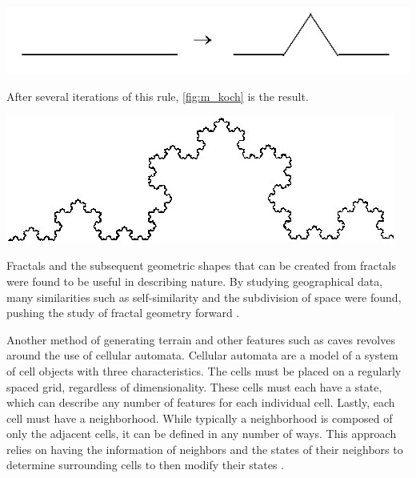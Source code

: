 \documentclass[10pt]{report}
\begin{document}
		\begin{minipage}{\textwidth}
			\centering
			\includegraphics[scale=0.5]{m_reprule}
			\label{fig:m_reprule}
		\end{minipage}
		
		After several iterations of this rule, \autoref{fig:m_koch} is the result.
		
		\begin{minipage}{\textwidth}
			\centering
			\includegraphics[scale=0.5]{m_koch}
			\label{fig:m_koch}
		\end{minipage}
	
		Fractals and the subsequent geometric shapes that can be created from fractals were found to be useful in describing nature. By studying geographical data, many similarities such as self-similarity and the subdivision of space were found, pushing the study of fractal geometry forward \cite{doi:10.1111/j.1467-8306.1987.tb00158.x}. 
		
		Another method of generating terrain and other features such as caves \cite{10.1145/1814256.1814266} revolves around the use of cellular automata. Cellular automata are a model of a system of cell objects with three characteristics. The cells must be placed on a regularly spaced grid, regardless of dimensionality. These cells must each have a state, which can describe any number of features for each individual cell. Lastly, each cell must have a neighborhood. While typically a neighborhood is composed of only the adjacent cells, it can be defined in any number of ways. This approach relies on having the information of neighbors and the states of their neighbors to determine surrounding cells to then modify their states \cite{nature-of-code}. 
		
\end{document}
